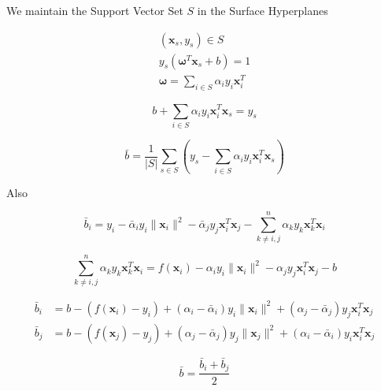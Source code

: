 \documentclass[a4paper,12pt]{article}
\begin{document}
        We maintain the Support Vector Set $S$ in the Surface Hyperplanes

        \begin{equation}
            \begin{split}
                (\bm{x}_s,y_s)\in S\\
                y_s(\bm{\omega}^T\bm{x}_s+b)=1\\
                \bm{\omega}=\sum_{i\in S}\alpha_iy_i\bm{x}_i^T
            \end{split}
        \end{equation}

        \begin{equation}
            b+\sum_{i\in S}\alpha_iy_i\bm{x}_i^T\bm{x}_s=y_s
        \end{equation}

        \begin{equation}
            \bar{b}=\frac{1}{|S|}\sum_{s\in S}\left(y_s-\sum_{i\in S}\alpha_iy_i\bm{x}_i^T\bm{x}_s\right)
        \end{equation}

        Also

        \begin{equation}
            \bar{b}_i=y_i-\bar{\alpha}_iy_i\|\bm{x}_i\|^2-\bar{\alpha}_jy_j\bm{x}_i^T\bm{x}_j-\sum_{k\neq i,j}^n\alpha_ky_k\bm{x}_k^T\bm{x}_i
        \end{equation}

        \begin{equation}
            \sum_{k\neq i,j}^n\alpha_ky_k\bm{x}_k^T\bm{x}_i=f(\bm{x}_i)-\alpha_iy_i\|\bm{x}_i\|^2-\alpha_jy_j\bm{x}_i^T\bm{x}_j-b
        \end{equation}

        \begin{equation}
            \begin{split}
                \bar{b}_i&=b-(f(\bm{x}_i)-y_i)+(\alpha_i-\bar{\alpha}_i)y_i\|\bm{x}_i\|^2+(\alpha_j-\bar{\alpha}_j)y_j\bm{x}_i^T\bm{x}_j\\
                \bar{b}_j&=b-(f(\bm{x}_j)-y_j)+(\alpha_j-\bar{\alpha}_j)y_j\|\bm{x}_j\|^2+(\alpha_i-\bar{\alpha}_i)y_i\bm{x}_i^T\bm{x}_j
            \end{split}
        \end{equation}

        \begin{equation}
            \bar{b}=\frac{\bar{b}_i+\bar{b}_j}{2}
        \end{equation}
\end{document}
